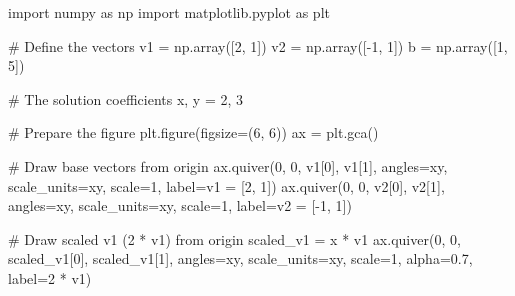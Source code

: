 \documentclass[
  letterpaper,
  DIV=11,
  numbers=noendperiod]{scrreprt}
\newenvironment{Shaded}{\begin{snugshade}}{\end{snugshade}}
\newcommand{\CommentTok}[1]{\textcolor[rgb]{0.37,0.37,0.37}{#1}}
\newcommand{\DecValTok}[1]{\textcolor[rgb]{0.68,0.00,0.00}{#1}}
\newcommand{\FloatTok}[1]{\textcolor[rgb]{0.68,0.00,0.00}{#1}}
\newcommand{\ImportTok}[1]{\textcolor[rgb]{0.00,0.46,0.62}{#1}}
\newcommand{\NormalTok}[1]{\textcolor[rgb]{0.00,0.23,0.31}{#1}}
\newcommand{\OperatorTok}[1]{\textcolor[rgb]{0.37,0.37,0.37}{#1}}
\newcommand{\StringTok}[1]{\textcolor[rgb]{0.13,0.47,0.30}{#1}}
\begin{document}
\begin{Shaded}
\begin{Highlighting}[]
\ImportTok{import}\NormalTok{ numpy }\ImportTok{as}\NormalTok{ np}
\ImportTok{import}\NormalTok{ matplotlib.pyplot }\ImportTok{as}\NormalTok{ plt}

\CommentTok{\# Define the vectors}
\NormalTok{v1 }\OperatorTok{=}\NormalTok{ np.array([}\DecValTok{2}\NormalTok{, }\DecValTok{1}\NormalTok{])}
\NormalTok{v2 }\OperatorTok{=}\NormalTok{ np.array([}\OperatorTok{{-}}\DecValTok{1}\NormalTok{, }\DecValTok{1}\NormalTok{])}
\NormalTok{b }\OperatorTok{=}\NormalTok{ np.array([}\DecValTok{1}\NormalTok{, }\DecValTok{5}\NormalTok{])}

\CommentTok{\# The solution coefficients}
\NormalTok{x, y }\OperatorTok{=} \DecValTok{2}\NormalTok{, }\DecValTok{3}

\CommentTok{\# Prepare the figure}
\NormalTok{plt.figure(figsize}\OperatorTok{=}\NormalTok{(}\DecValTok{6}\NormalTok{, }\DecValTok{6}\NormalTok{))}
\NormalTok{ax }\OperatorTok{=}\NormalTok{ plt.gca()}

\CommentTok{\# Draw base vectors from origin}
\NormalTok{ax.quiver(}\DecValTok{0}\NormalTok{, }\DecValTok{0}\NormalTok{, v1[}\DecValTok{0}\NormalTok{], v1[}\DecValTok{1}\NormalTok{], angles}\OperatorTok{=}\StringTok{\textquotesingle{}xy\textquotesingle{}}\NormalTok{, scale\_units}\OperatorTok{=}\StringTok{\textquotesingle{}xy\textquotesingle{}}\NormalTok{, scale}\OperatorTok{=}\DecValTok{1}\NormalTok{,}
\NormalTok{          label}\OperatorTok{=}\StringTok{\textquotesingle{}v1 = [2, 1]\textquotesingle{}}\NormalTok{)}
\NormalTok{ax.quiver(}\DecValTok{0}\NormalTok{, }\DecValTok{0}\NormalTok{, v2[}\DecValTok{0}\NormalTok{], v2[}\DecValTok{1}\NormalTok{], angles}\OperatorTok{=}\StringTok{\textquotesingle{}xy\textquotesingle{}}\NormalTok{, scale\_units}\OperatorTok{=}\StringTok{\textquotesingle{}xy\textquotesingle{}}\NormalTok{, scale}\OperatorTok{=}\DecValTok{1}\NormalTok{,}
\NormalTok{          label}\OperatorTok{=}\StringTok{\textquotesingle{}v2 = [{-}1, 1]\textquotesingle{}}\NormalTok{)}

\CommentTok{\# Draw scaled v1 (2 * v1) from origin}
\NormalTok{scaled\_v1 }\OperatorTok{=}\NormalTok{ x }\OperatorTok{*}\NormalTok{ v1}
\NormalTok{ax.quiver(}\DecValTok{0}\NormalTok{, }\DecValTok{0}\NormalTok{, scaled\_v1[}\DecValTok{0}\NormalTok{], scaled\_v1[}\DecValTok{1}\NormalTok{], angles}\OperatorTok{=}\StringTok{\textquotesingle{}xy\textquotesingle{}}\NormalTok{, scale\_units}\OperatorTok{=}\StringTok{\textquotesingle{}xy\textquotesingle{}}\NormalTok{, scale}\OperatorTok{=}\DecValTok{1}\NormalTok{,}
\NormalTok{          alpha}\OperatorTok{=}\FloatTok{0.7}\NormalTok{, label}\OperatorTok{=}\StringTok{\textquotesingle{}2 * v1\textquotesingle{}}\NormalTok{)}


\end{Highlighting}
\end{Shaded}
\end{document}
